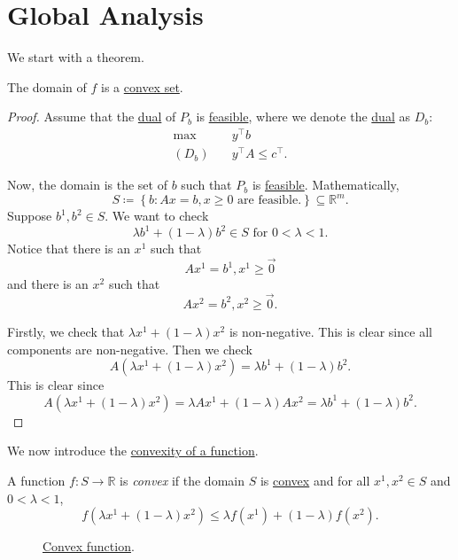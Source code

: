 \section{Global Analysis}
We start with a theorem.

\begin{theorem}\label{thm:lec14-1}
	The domain of \(f\) is a \hyperref[def:convex-set]{convex set}.
\end{theorem}
\begin{proof}
	Assume that the \hyperref[def:dual]{dual} of \(P_b\) is \hyperref[def:feasible-solution]{feasible}, where we denote the \hyperref[def:dual]{dual} as \(D_b\):
	\[
		\begin{aligned}
			\max~      & y^{\top}b               \\
			(D_b)\quad & y^{\top}A\leq c^{\top}.
		\end{aligned}
	\]

	Now, the domain is the set of \(b\) such that \(P_b\) is \hyperref[def:feasible-solution]{feasible}. Mathematically,
	\[
		S\coloneqq \left\{ b\colon Ax = b, x\geq 0 \text{ are feasible.}\right\}\subseteq \mathbb{R}^m.
	\]
	Suppose \(b^1, b^2\in S\). We want to check
	\[
		\lambda b^{1}+(1-\lambda) b^2 \in S\text{ for }0<\lambda<1.
	\]
	Notice that there is an \(x^1\) such that
	\[
		Ax^1 = b^1, x^1\geq \vec{0}
	\]
	and there is an \(x^2\) such that
	\[
		Ax^2 = b^2, x^2\geq \vec{0}.
	\]

	Firstly, we check that \(\lambda x^{1}+(1 - \lambda)x^2\) is non-negative. This is clear since all components are non-negative. Then we check
	\[
		A(\lambda x^{1}+(1 - \lambda)x^2) = \lambda b^1 + (1 - \lambda)b^2.
	\]
	This is clear since
	\[
		A(\lambda x^{1}+(1 - \lambda)x^2) = \lambda Ax^1 + (1 - \lambda)Ax^2 = \lambda b^1 + (1-\lambda)b^2.
	\]
\end{proof}

We now introduce the \hyperref[def:convex-function]{convexity of a function}.

\begin{definition}\label{def:convex-function}
	A function \(f\colon S \to \mathbb{R} \) is \emph{convex} if the domain \(S\) is \hyperref[def:convex-set]{convex} and for all \(x^1, x^2\in S\) and \(0 < \lambda < 1\),
	\[
		f(\lambda x^1+(1 - \lambda)x^2)\leq \lambda f(x^1)+(1-\lambda)f(x^2).
	\]
\end{definition}

\begin{figure}[H]
	\centering
	\caption{\hyperref[def:convex-function]{Convex function}.}
	\label{fig:convex-functiona}
\end{figure}

